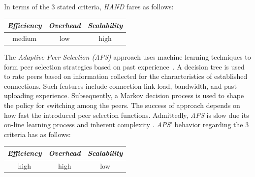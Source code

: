 In terms of the $3$ stated criteria, \emph{HAND} fares as follows:
\begin{center}
{\footnotesize
\begin{tabular}{ccc}
\emph{Efficiency} & \emph{Overhead} & \emph{Scalability} \\
\hline
medium &
low &
high
\end{tabular}
}
\end{center}

The \emph{Adaptive Peer Selection (APS)} approach uses 
machine learning techniques to form peer selection strategies based on past
experience~\cite{BFLZ2003}. A decision tree is used to rate peers based on
information collected for the characteristics of established connections. Such
features include connection link load, bandwidth, and past uploading experience.
Subsequently, a Markov decision process is used
to shape the policy for switching among the peers. The success of approach depends on
how fast the introduced peer selection functions. Admittedly, \emph{APS} is slow 
due its on-line learning process and inherent complexity \cite{ZZLZ2009}. 
\emph{APS}' behavior regarding the $3$ criteria has as follows:
\begin{center}
{\footnotesize
\begin{tabular}{ccc}
\emph{Efficiency} & \emph{Overhead} & \emph{Scalability} \\
\hline
high &
high &
low
\end{tabular}
}
\end{center}

